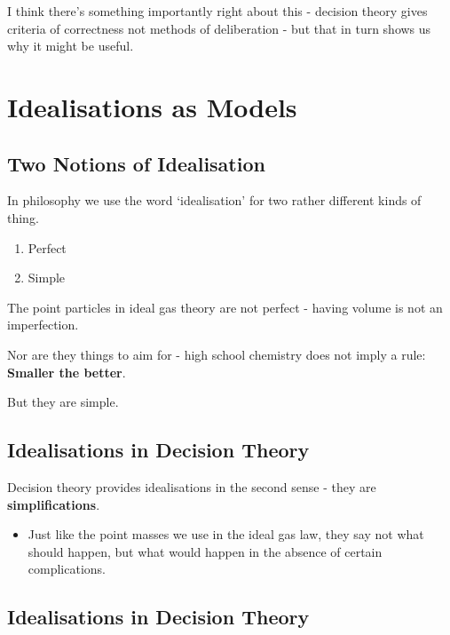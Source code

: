\documentclass[
  11pt,
  letterpaper,
  DIV=11,
  numbers=noendperiod,
  oneside]{scrartcl}
\providecommand{\tightlist}{%
  \setlength{\itemsep}{0pt}\setlength{\parskip}{0pt}}\usepackage{longtable,booktabs,array}
\begin{document}
I think there's something importantly right about this - decision theory
gives criteria of correctness not methods of deliberation - but that in
turn shows us why it might be useful.

\section{Idealisations as Models}\label{idealisations-as-models}

\subsection{Two Notions of
Idealisation}\label{two-notions-of-idealisation}

In philosophy we use the word `idealisation' for two rather different
kinds of thing.

\begin{enumerate}
\def\labelenumi{\arabic{enumi}.}
\tightlist
\item
  Perfect
\item
  Simple
\end{enumerate}

The point particles in ideal gas theory are not perfect - having volume
is not an imperfection.

Nor are they things to aim for - high school chemistry does not imply a
rule: \textbf{Smaller the better}.

But they are simple.

\subsection{Idealisations in Decision
Theory}\label{idealisations-in-decision-theory}

Decision theory provides idealisations in the second sense - they are
\textbf{simplifications}.

\begin{itemize}
\tightlist
\item
  Just like the point masses we use in the ideal gas law, they say not
  what should happen, but what would happen in the absence of certain
  complications.
\end{itemize}

\subsection{Idealisations in Decision
Theory}\label{idealisations-in-decision-theory-1}
\end{document}
